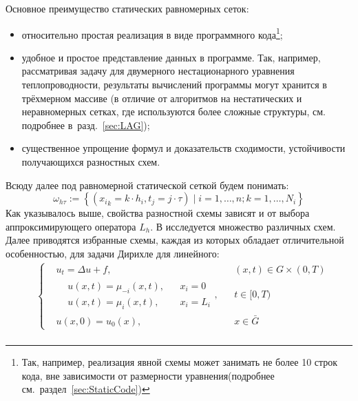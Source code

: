 Основное преимущество статических равномерных сеток:
\begin{itemize}
    \item относительно простая реализация в виде программного кода\footnote{Так, например, реализация явной схемы может занимать не более 10 строк кода, вне зависимости от размерности уравнения(подробнее см.~раздел~\ref{sec:StaticCode})};
    \item удобное и простое представление данных в программе. Так, например, рассматривая задачу для двумерного нестационарного уравнения теплопроводности, результаты вычислений программы могут хранится в трёхмерном массиве (в отличие от алгоритмов на нестатических и неравномерных сетках, где используются более сложные структуры, см. подробнее в~разд.~\ref{sec:LAG});
    \item существенное упрощение формул и доказательств сходимости, устойчивости получающихся разностных схем.
\end{itemize}
Всюду далее под равномерной статической сеткой будем понимать:
\begin{equation*}
    \omega_{h\tau} := \left\{ 
        ({x_i}_k = k \cdot h_i, t_j = j \cdot \tau) \mid 
        i = 1, \ldots, n; k = 1, \ldots, N_i
     \right\}
\end{equation*}
Как указывалось выше, свойства разностной схемы зависят и от выбора аппроксимирующего оператора $L_h$.
В \cite{СамарскийТеорияРазностныхСхем} исследуется множество различных схем.
Далее приводятся избранные схемы, каждая из которых обладает отличительной особенностью, для задачи Дирихле для линейного:
\begin{equation*}
    \begin{aligned}
        &\left\{ 
            \begin{aligned}
                & u_t = \Delta u + f, && (x, t) \in G \times (0, T)\\
                & \begin{aligned}
                    & u(x, t) = \mu_{-i}(x, t), && x_i = 0\\
                    & u(x, t) = \mu_{i}(x, t), && x_i = L_i
                \end{aligned}, && t \in [0, T)\\
                &u(x, 0) = u_0(x), && x \in \bar{G}
            \end{aligned}
        \right.\\
    \end{aligned}
\end{equation*}

